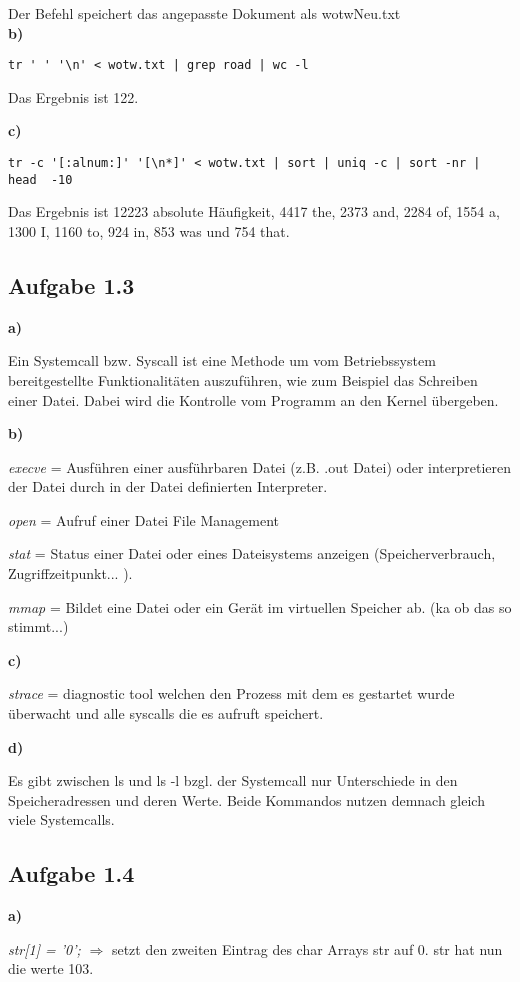\documentclass[a4paper,graphics,11pt]{article}
\newcommand{\aufgabe}[1]{\subsection*{Aufgabe #1}}
\begin{document}
Der Befehl speichert das angepasste Dokument als wotwNeu.txt\\


\textbf{b)}

\begin{verbatim}
tr ' ' '\n' < wotw.txt | grep road | wc -l
\end{verbatim}



Das Ergebnis ist 122.

\textbf{c)}

\begin{verbatim}
tr -c '[:alnum:]' '[\n*]' < wotw.txt | sort | uniq -c | sort -nr | head  -10
\end{verbatim}


Das Ergebnis ist 12223 absolute Häufigkeit, 4417 the, 2373 and, 2284 of, 1554 a, 1300 I, 1160 to, 924 in, 853 was und 754 that.

\aufgabe{1.3}
\textbf{a)}

Ein Systemcall bzw. Syscall ist eine Methode um vom Betriebssystem bereitgestellte Funktionalitäten auszuführen, wie zum Beispiel das Schreiben einer Datei. Dabei wird die Kontrolle vom Programm an den Kernel übergeben.

\textbf{b)}

\textit{execve} = Ausführen einer ausführbaren Datei (z.B. .out Datei) oder interpretieren der Datei durch in der Datei definierten Interpreter.

\textit{open} = Aufruf einer Datei File Management

\textit{stat} = Status einer Datei oder eines Dateisystems anzeigen (Speicherverbrauch, Zugriffzeitpunkt... ).

\textit{mmap} = Bildet eine Datei oder ein Gerät im virtuellen Speicher ab. (ka ob das so stimmt...)


\textbf{c)}

\textit{strace} = diagnostic tool welchen den Prozess mit dem es gestartet wurde überwacht und alle syscalls die es aufruft speichert.

\newpage

\textbf{d)}

Es gibt zwischen ls und ls -l bzgl. der Systemcall nur Unterschiede in den Speicheradressen und deren Werte. Beide Kommandos nutzen demnach gleich viele Systemcalls.

\aufgabe{1.4}

\textbf{a)}

\textit{str[1] = ’0’;} $\Longrightarrow$ setzt den zweiten Eintrag des char Arrays str auf 0. str hat nun die werte 103.
\end{document}
